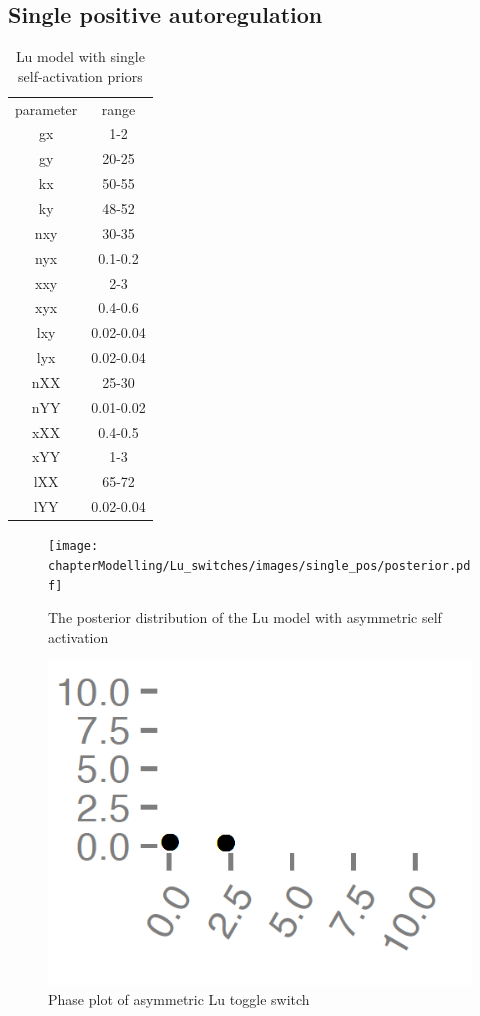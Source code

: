 \subsection{Single positive autoregulation}
\begin{table}[htbp]
\centering

\caption{Lu model with single self-activation priors}
\label{tab:lu_sp_pr}
\begin{tabular}{cc}
parameter & range \\
gx & 1-2 \\
gy & 20-25 \\
kx & 50-55 \\
ky & 48-52 \\
nxy & 30-35 \\
nyx & 0.1-0.2 \\
xxy & 2-3 \\
xyx & 0.4-0.6 \\
lxy & 0.02-0.04 \\
lyx & 0.02-0.04 \\
nXX & 25-30  \\
nYY & 0.01-0.02 \\
xXX & 0.4-0.5 \\
xYY & 1-3 \\
lXX & 65-72 \\
lYY & 0.02-0.04
\end{tabular}
\end{table}
\clearpage
\begin{figure}[t]
\centering
\texttt{[image: chapterModelling/Lu\_switches/images/single\_pos/posterior.pdf]}
\caption[The posterior distribution of the Lu model with asymmetric self activation]{The posterior distribution of the Lu model with asymmetric self activation}
\label{q}
\end{figure}

\begin{figure}[t]
\centering
\includegraphics[scale=0.2]{chapterModelling/Lu_switches/images/single_pos/phase_plot.png}
\caption{Phase plot of asymmetric Lu toggle switch}
\label{q}
\end{figure}
\clearpage

